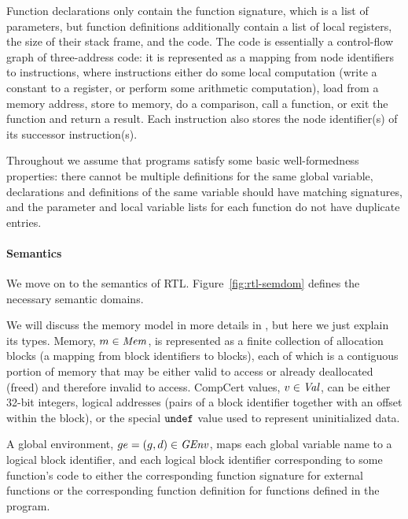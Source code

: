 Function declarations only contain the function signature, which is a list of parameters, but
function definitions additionally contain a list of local registers, the size of their stack frame,
and the code.  The code is essentially a control-flow graph of three-address code: it is represented
as a mapping from node identifiers to instructions, where instructions either
%
do some local computation (\eg write a constant to a register, or perform some arithmetic
computation),
%
load from a memory address, 
%
store to memory,
%
do a comparison,
%
call a function, 
%
or exit the function and return a result. 
%
Each instruction also stores the node identifier(s) of its successor instruction(s).

Throughout we assume that programs satisfy some basic well-formedness properties: there cannot be
multiple definitions for the same global variable, declarations and definitions of the same variable
should have matching signatures, and the parameter and local variable lists for each function do not
have duplicate entries.


\paragraph{Semantics}



We move on to the semantics of RTL.  Figure~\ref{fig:rtl-semdom} defines the necessary semantic
domains.

We will discuss the memory model in more details in , but here we just
explain its types.  Memory, $m\in\mathit{Mem}$, is represented as a finite collection of allocation
blocks (a mapping from block identifiers to blocks), each of which is a contiguous portion of memory
that may be either valid to access or already deallocated (freed) and therefore invalid to access.
CompCert values, $v\in\mathit{Val}$, can be either 32-bit integers, logical addresses (pairs of a block
identifier together with an offset within the block), or the special $\mathtt{undef}$ value used to
represent uninitialized data.



A global environment, $ge=(g,d)\in\mathit{GEnv}$, maps each global variable name to a logical block
identifier, and each logical block identifier corresponding to some function's code to either the
corresponding function signature for external functions or the corresponding function definition for
functions defined in the program.

